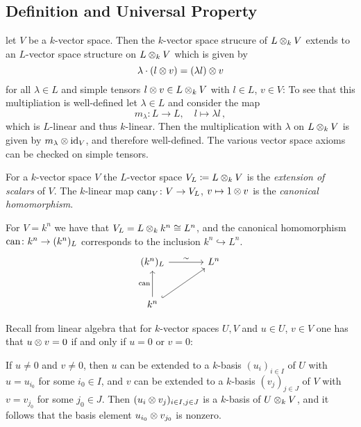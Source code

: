 \subsection{Definition and Universal Property}


\begin{fluff}
  let $V$ be a $k$-vector space.
  Then the $k$-vector space strucure of $L \mathbin{\otimes}_k V$ extends to an $L$-vector space structure on $L \mathbin{\otimes}_k V$ which is given by
  \[
      \lambda \cdot (l \mathbin{\otimes} v)
    = (\lambda l) \mathbin{\otimes} v
  \]
  for all $\lambda \in L$ and simple tensors $l \mathbin{\otimes} v \in L \mathbin{\otimes}_k V$ with $l \in L$, $v \in V$:
  To see that this multipliation is well-defined let $\lambda \in L$ and consider the map
  \[
            m_\lambda
    \colon  L
    \to     L,
    \quad   l
    \mapsto \lambda l \,,
  \]
  which is $L$-linear and thus $k$-linear.
  Then the multiplication with $\lambda$ on $L \mathbin{\otimes}_k V$ is given by $m_\lambda \mathbin{\otimes} \operatorname{id}_V$, and therefore well-defined.
  The various vector space axioms can be checked on simple tensors.
\end{fluff}


\begin{definition}
  For a $k$-vector space $V$ the $L$-vector space $V_L \coloneqq L \otimes_k V$ is the \emph{extension of scalars} of $V$.
  The $k$-linear map $\operatorname{can}_V \colon V \to V_L$, $v \mapsto 1 \mathbin{\otimes} v$ is the \emph{canonical homomorphism}.
\end{definition}


\begin{example}
  \label{example: extension of scalars for kn}
  For $V = k^n$ we have that $V_L = L \mathbin{\otimes}_k k^n \cong L^n$, and the canonical homomorphism $\operatorname{can} \colon k^n \to (k^n)_L$ corresponds to the inclusion $k^n \hookrightarrow L^n$.
  \[
    \begin{tikzcd}[sep = large]
        (k^n)_L
        \arrow{r}[above]{\sim}
      & L^n
      \\
        k^n
        \arrow{u}[left]{\can}
        \arrow[hookrightarrow]{ur}
      & {}
    \end{tikzcd}
  \]
\end{example}


\begin{recall}
  Recall from linear algebra that for $k$-vector spaces $U, V$ and $u \in U$, $v \in V$ one has that $u \mathbin{\otimes} v = 0$ if and only if $u = 0$ or $v = 0$:
  
  If $u \neq 0$ and $v \neq 0$, then $u$ can be extended to a $k$-basis $(u_i)_{i \in I}$ of $U$ with $u = u_{i_0}$ for some $i_0 \in I$, and $v$ can be extended to a $k$-basis $(v_j)_{j \in J}$ of $V$ with $v = v_{j_0}$ for some $j_0 \in J$.
  Then $(u_i \mathbin{\otimes} v_j)_{i \in I, j \in J}$ is a $k$-basis of $U \mathbin{\otimes}_k V$, and it follows that the basis element $u_{i_0} \mathbin{\otimes} v_{j_0}$ is nonzero.
\end{recall}


